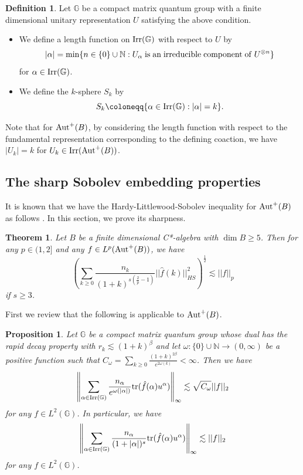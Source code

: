 \documentclass[12pt]{amsart}
\theoremstyle{plain} %
\newtheorem{theorem}[equation]{Theorem}
\newtheorem{proposition}[equation]{Proposition}
\theoremstyle{definition}
\newtheorem{definition}[equation]{Definition}
\theoremstyle{remark}
\begin{document}
\begin{definition}
Let $\mathbb{G}$ be a compact matrix quantum group with a finite dimensional unitary representation $U$ satisfying the above condition.
\begin{itemize}
\item We define a length function on ${\rm Irr}(\mathbb{G})$ with respect to $U$ by
\[|\alpha|=\min\{n\in\{0\}\cup\mathbb{N}:U_{\alpha}\;{\rm is\;an\;irreducible\;component\;of}\;U^{\otimes n}\}\] 
for $\alpha\in{\rm Irr}(\mathbb{G})$.
\item We define the $k$-sphere $S_k$ by
\[S_k\coloneqq\{\alpha\in{\rm Irr}(\mathbb{G}):|\alpha|=k\}.\]
\end{itemize}
\end{definition}

Note that for ${\rm Aut}^+(B)$, by considering the length function with respect to the fundamental representation corresponding to the defining coaction, we have $|U_k|=k$ for $U_k\in {\rm Irr}({\rm Aut}^+(B))$.

\subsection{The sharp Sobolev embedding properties}

It is known that we have the Hardy-Littlewood-Sobolev inequality for ${\rm Aut}^+(B)$ as follows \cite[Theorem 4.5]{You20}. In this section, we prove its sharpness.

\begin{theorem}\label{Sobolev}
Let $B$ be a finite dimensional C*-algebra with $\dim B\geq5$.
Then for any $p\in (1, 2]$ and any $f\in L^p({\rm Aut}^+(B))$, we have
 \[\left(\sum_{k\geq0}\frac{n_k}{(1+k)^{s(\frac{2}{p}-1)}}||\widehat{f}(k)||_{HS}^2\right)^{\frac{1}{2}}\lesssim||f||_p\]
if $s\geq 3$.
\end{theorem}


First we review that the following \cite[Proposition 5.2]{You20} is applicable to ${\rm Aut}^+(B)$.

\begin{proposition}\label{infty<2}
Let $\mathbb{G}$ be a compact matrix quantum group whose dual has the rapid decay property with $r_k\lesssim (1+k)^\beta$ and let $\omega:\{0\}\cup\mathbb{N}\to (0, \infty)$ be a positive function such that $C_{\omega}=\sum_{k\geq0}\frac{(1+k)^{2\beta}}{e^{2\omega(k)}}<\infty$.
Then we have 
\[\left \lVert \sum_{\alpha\in {\rm Irr}(\mathbb{G})} \frac{n_\alpha}{e^{\omega(|\alpha|)}} {\rm tr}(\hat{f}(\alpha)u^{\alpha})\right\rVert_{\infty} \lesssim \sqrt{C_{\omega}}||f||_2\]
for any $f\in L^2(\mathbb{G})$.
In particular, we have
\[\left\lVert \sum_{\alpha\in {\rm Irr}(\mathbb{G}) }\frac{n_\alpha}{(1+|\alpha|)^s} {\rm tr}(\hat{f}(\alpha)u^{\alpha})\right\rVert_{\infty} \lesssim ||f||_2\]
for any $f\in L^2(\mathbb{G})$.
\end{proposition}
\end{document}
